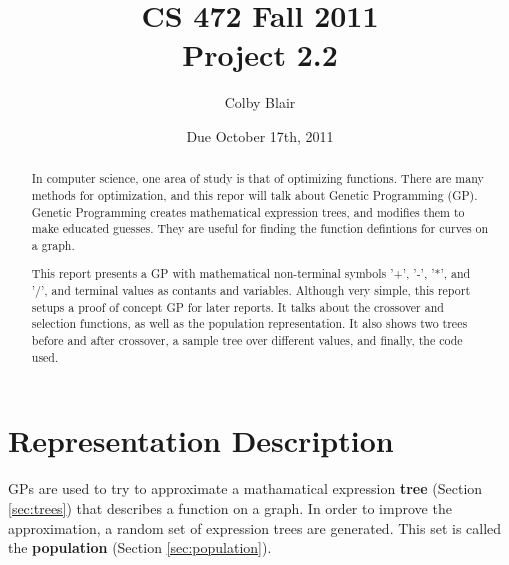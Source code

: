 \documentclass[12pt]{article}
\title{CS 472 Fall 2011 \\
     Project 2.2}
\author{Colby Blair}
\date{Due October 17th, 2011}
\begin{document}
\maketitle

\begin{abstract}
In computer science, one area of study is that of optimizing functions. There are many methods for optimization, and this repor will talk about Genetic Programming (GP). Genetic Programming creates mathematical expression trees, and modifies them to make educated guesses. They are useful for finding the function defintions for curves on a graph. 

This report presents a GP with mathematical non-terminal symbols '+', '-', '*', and '/', and terminal values as contants and variables. Although very simple, this report setups a proof of concept GP for later reports. It talks about the crossover and selection functions, as well as the population representation. It also shows two trees before and after crossover, a sample tree over different values, and finally, the code used.
\end{abstract}

\pagebreak

\tableofcontents
\listoffigures

\pagebreak

\part{Representation Description}
GPs are used to try to approximate a mathamatical expression \textbf{tree} (Section \ref{sec:trees}) that describes a function on a graph. In order to improve the approximation, a random set of expression trees are generated. This set is called the \textbf{population} (Section \ref{sec:population}). 
\end{document}
